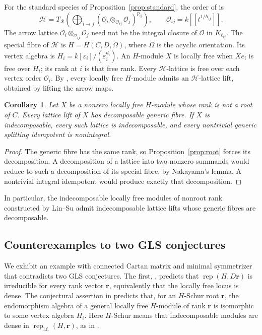 \documentclass[11pt, reqno]{amsart}
\numberwithin{equation}{section}
\newtheorem{corollary}[theorem]{Corollary}
\theoremstyle{definition}
\theoremstyle{remark}
\newcommand{\op}[1]{\operatorname{#1}}
\newcommand{\mc}[1]{\mathcal{#1}}
\newcommand{\ms}[1]{\mathscr{#1}}
\newcommand{\OO}{\mc O}
\newcommand{\RR}{\mc R}
\newcommand{\Rep}{\op{rep}}
\begin{document}
For the standard species of Proposition~\ref{prop:standard}, the order
of \cite[Sections~4.1--4.2]{GLSrigid} is
\[ \ms H=T_{\RR}\!\left(\bigoplus_{i\to j} (\OO_i\otimes_{\OO_{ij}}\OO_j)^{p_{ij}}\right), \qquad \OO_{ij}=k[[t^{1/h_{ij}}]]. \]
The arrow lattice $\OO_i\otimes_{\OO_{ij}}\OO_j$ need not be
the integral closure of $\OO$ in $K_{\ell_{ij}}$. The special fibre of $\ms H$ is
$H=H(C,D,\Omega)$, where $\Omega$ is the acyclic orientation.
Its vertex algebra is $H_i=k[\varepsilon_i]/(\varepsilon_i^{d_i})$.
An $H$-module $X$ is locally free when $Xe_i$ is free over $H_i$;
its rank at $i$ is that free rank. Every $\ms H$-lattice is free over each vertex order $\OO_i$.
By \cite[Lemma~5.4]{GLSrigid}, every locally free $H$-module admits
an $\ms H$-lattice lift, obtained by lifting the arrow maps.



\begin{corollary}\label{cor:nonroot-lifts}
Let $X$ be a nonzero locally free $H$-module whose rank is not a
root of $C$. Every lattice lift of $X$ has decomposable generic
fibre. If $X$ is indecomposable, every such lattice is indecomposable,
and every nontrivial generic splitting idempotent is nonintegral.
\end{corollary}
\begin{proof}
The generic fibre has the same rank, so Proposition~\ref{prop:root} forces
its decomposition. A decomposition of a lattice into two nonzero
summands would reduce to such a decomposition of its special fibre,
by Nakayama's lemma. A nontrivial integral idempotent would produce
exactly that decomposition.
\end{proof}

In particular, the indecomposable locally free modules of nonroot
rank constructed by Lin--Su \cite{LinSu} admit indecomposable lattice
lifts whose generic fibres are decomposable.


\subsection{Counterexamples to two GLS conjectures}
\label{subsec:gls-counterexamples}
We exhibit an example with connected Cartan matrix and minimal
symmetrizer that contradicts two GLS conjectures. The first,
\cite[p.~23, Conjecture~5.1]{GLSII}, predicts that
$\Rep(H,D\mathbf r)$ is irreducible for every rank vector
$\mathbf r$, equivalently that the locally free locus is dense.
The conjectural assertion in \cite[p.~23, Section~5.4]{GLSII}
predicts that, for an $H$-Schur root $\mathbf r$, the endomorphism
algebra of a general locally free $H$-module of rank $\mathbf r$ is
isomorphic to some vertex algebra $H_i$. Here $H$-Schur means that
indecomposable modules are dense in
$\Rep_{\mathrm{l.f.}}(H,\mathbf r)$, as in
\cite[Section~3.3]{GLSII}.
\end{document}
